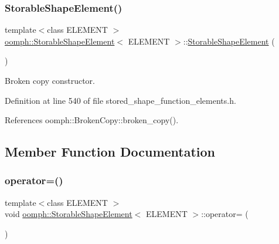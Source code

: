 \subsubsection{\texorpdfstring{Storable\+Shape\+Element()}{StorableShapeElement()}\hspace{0.1cm}{\footnotesize\ttfamily [2/2]}}
{\footnotesize\ttfamily template$<$class E\+L\+E\+M\+E\+NT $>$ \\
\hyperlink{classoomph_1_1StorableShapeElement}{oomph\+::\+Storable\+Shape\+Element}$<$ E\+L\+E\+M\+E\+NT $>$\+::\hyperlink{classoomph_1_1StorableShapeElement}{Storable\+Shape\+Element} (\begin{DoxyParamCaption}\item[{const \hyperlink{classoomph_1_1StorableShapeElement}{Storable\+Shape\+Element}$<$ E\+L\+E\+M\+E\+NT $>$ \&}]{ }\end{DoxyParamCaption})\hspace{0.3cm}{\ttfamily [inline]}}



Broken copy constructor. 



Definition at line 540 of file stored\+\_\+shape\+\_\+function\+\_\+elements.\+h.



References oomph\+::\+Broken\+Copy\+::broken\+\_\+copy().



\subsection{Member Function Documentation}
\mbox{\label{classoomph_1_1StorableShapeElement_a3436eabded443d3746be5c50daabe603}} 
\subsubsection{\texorpdfstring{operator=()}{operator=()}}
{\footnotesize\ttfamily template$<$class E\+L\+E\+M\+E\+NT $>$ \\
void \hyperlink{classoomph_1_1StorableShapeElement}{oomph\+::\+Storable\+Shape\+Element}$<$ E\+L\+E\+M\+E\+NT $>$\+::operator= (\begin{DoxyParamCaption}\item[{const \hyperlink{classoomph_1_1StorableShapeElement}{Storable\+Shape\+Element}$<$ E\+L\+E\+M\+E\+NT $>$ \&}]{ }\end{DoxyParamCaption})\hspace{0.3cm}{\ttfamily [inline]}}



